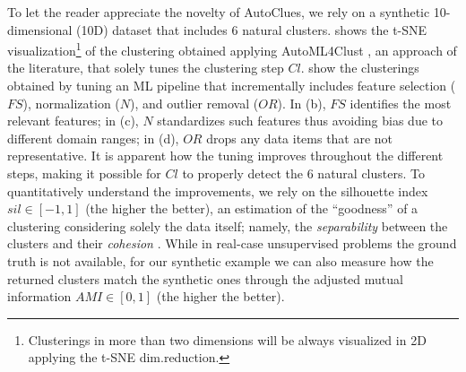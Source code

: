 To let the reader appreciate the novelty of AutoClues, we rely on a synthetic 10-dimensional (10D) dataset that includes 6 natural clusters.  shows the t-SNE \cite{van2008visualizing} visualization\footnote{Clusterings in more than two dimensions will be always visualized in 2D applying the t-SNE dim.reduction.}  of the clustering obtained applying AutoML4Clust \cite{Tschechlov2021}, an approach of the literature, that solely tunes the clustering step $Cl$.  show the clusterings obtained by tuning an ML pipeline that incrementally includes feature selection ($FS$), normalization ($N$), and outlier removal ($OR$). In (b), $FS$ identifies the most relevant features; in (c), $N$ standardizes such features thus avoiding bias due to different domain ranges; in (d), $OR$ drops any data items that are not representative.
It is apparent how the tuning improves throughout the different steps, making it possible for $Cl$ to properly detect the 6 natural clusters.
To quantitatively understand the improvements, we rely on the silhouette index $sil \in [-1, 1]$ (the higher the better), an estimation of the ``goodness'' of a clustering considering solely the data itself; namely, the \textit{separability} between the clusters and their \textit{cohesion} \cite{zhu2010clustering}.
While in real-case unsupervised problems the ground truth is not available, for our synthetic example we can also measure how the returned clusters match the synthetic ones through the adjusted mutual information \cite{vinh2009information} $AMI \in [0, 1]$ (the higher the better).

